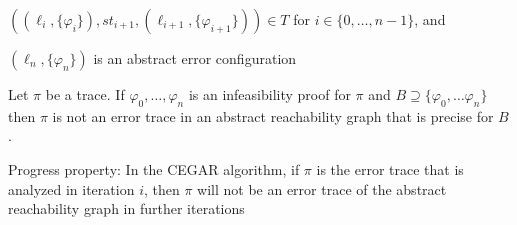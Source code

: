 \documentclass[landscape, a4paper]{article}
\begin{document}
\begin{minipage}[t]{0.2\linewidth}
\begin{betterlist}
\begin{betterlist}
			\item $( (\ell_i, \{ \varphi_i\} ), st_{i+1}, (\ell_{i+1}, \{ \varphi_{i+1}\} ) ) \in T$ for $i \in \{ 0,\ldots , n −1\}$, and
			\item $(\ell_n, \{ \varphi_n\} )$ is an abstract error configuration
		\end{betterlist}\color{black}
		\item Let $\pi$  be a trace. If $\varphi_0,\ldots , \varphi_n$ is an infeasibility proof for $\pi$  and $B \supseteq \{ \varphi_0,\ldots \varphi_n\}$  then $\pi$  is not an error trace in an abstract reachability graph that is precise for $B$. 
		\item \alert{Progress property:} In the CEGAR algorithm, if $\pi$ is the error trace that is analyzed in iteration $i$, then $\pi$ will not be an error trace of the abstract reachability graph in further iterations
	\end{betterlist}
\end{minipage}

\newpage
\end{document}
